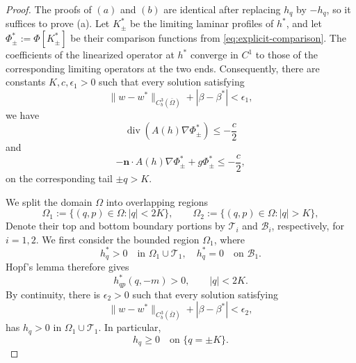 \documentclass[12pt,letterpaper]{amsart}
\numberwithin{equation}{section}
\begin{document}
	\begin{proof}
		The proofs of $(a)$ and $(b)$ are identical after replacing $h_q$ by $-h_q$, {so it suffices to prove (a).}
		{Let $K_\pm^*$ be the limiting laminar profiles of $h^*$, and let $\Phi_\pm^*:=\Phi[K_\pm^*]$ be their comparison functions from \eqref{eq:explicit-comparison}. The coefficients of the linearized operator at $h^*$ converge in $C^1$ to those of the corresponding limiting operators at the two ends. Consequently, there are constants $K,c,\epsilon_1>0$ such that every solution satisfying}
		\begin{equation*}
				\|w - w^*\|_{C_b^3(\bar{\Omega})} + |\beta - \beta^*| < \epsilon_1,
		\end{equation*}
		we have
		\begin{equation*}
			\operatorname{div}(A(h)\nabla\Phi_{\pm}^*) \leq -\frac{c}{2}
		\end{equation*}
		and
		\begin{equation*}
			-\mathbf{n} \cdot A(h) \nabla \Phi_{\pm}^* + g \Phi_{\pm}^* \leq -\frac{c}{2},
		\end{equation*}
		{on the corresponding tail $\pm q>K$.}
		
		We split the domain $\Omega$ into overlapping regions
		\begin{equation*}
			\Omega_1:=\{(q,p)\in\Omega:|q|<2K\},\qquad\Omega_2:=\{(q,p)\in\Omega:|q|>K\},
		\end{equation*}
		{Denote their top and bottom boundary portions by $\mathcal T_i$ and $\mathcal B_i$, respectively, for $i=1,2$. We first consider the bounded region $\Omega_1$, where}
		\begin{equation*}
			h_q^* > 0 \quad {\text{in }\Omega_1\cup\mathcal T_1}, \quad h_q^* = 0 \quad {\text{on }\mathcal B_1}.
		\end{equation*}
		{Hopf's lemma therefore gives}
		\begin{equation*}
			{h_{qp}^*(q,-m)>0,\qquad|q|<2K.}
		\end{equation*}
		 {By continuity, there is $\epsilon_2>0$ such that every solution satisfying}
		\begin{equation*}
				\|w - w^*\|_{C_b^3(\bar{\Omega})} + |\beta - \beta^*| < \epsilon_2,
		\end{equation*}
		{has $h_q>0$ in $\Omega_1\cup\mathcal T_1$.}
		In particular,
		\[
		h_q \geq 0 \quad \text{on } \{q = \pm K\}.
		\]
		

\end{proof}
\end{document}
